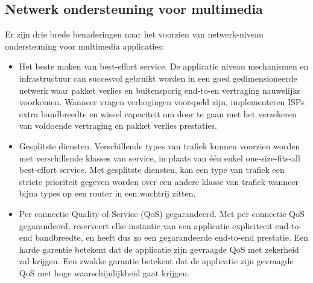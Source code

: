 \subsection{Netwerk ondersteuning voor multimedia}

Er zijn drie brede benaderingen naar het voorzien van netwerk-niveau ondersteuning voor multimedia applicaties:
\begin{itemize}
    
\item	Het beste maken van best-effort service. De applicatie niveau mechanismen en infrastructuur can succesvol gebruikt worden in een goed gedimensioneerde netwerk waar pakket verlies en buitensporig end-to-en vertraging nauwelijks voorkomen. Wanneer vragen verhogingen voorspeld zijn, implementeren ISPs extra bandbreedte en wissel capaciteit om door te gaan met het verzekeren van voldoende vertraging en pakket verlies prestaties.
\item	Gesplitste diensten. Verschillende types van trafiek kunnen voorzien worden met verschillende klasses van service, in plaats van één enkel one-size-fits-all best-effort service. Met gesplitste diensten, kan een type van trafiek een stricte prioriteit gegeven worden over een andere klasse van trafiek wanneer bijna types op een router in een wachtrij zitten.
\item	Per connectie Quality-of-Service (QoS) gegarandeerd. Met per connectie QoS gegarandeerd, reserveert elke instantie van een applicatie expliciteeit end-to-end bandbreedte, en heeft dus zo een gegarandeerde end-to-end prestatie. Een harde garentie betekent dat de applicatie zijn gevraagde QoS met zekerheid zal krijgen. Een zwakke garantie betekent dat de applicatie zijn gevraagde QoS met hoge waarschijnlijkheid gaat krijgen.
\end{itemize}

\clearpage


